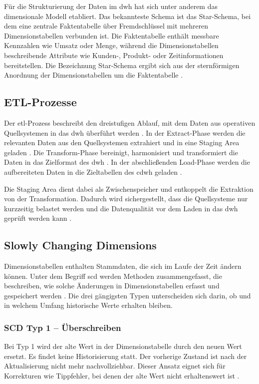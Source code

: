 \documentclass[a4paper,11pt]{article}
\begin{document}
Für die Strukturierung der Daten im \gls{dwh} hat sich unter anderem das dimensionale Modell etabliert. Das bekannteste 
Schema ist das Star-Schema, bei dem eine zentrale Faktentabelle über Fremdschlüssel mit mehreren Dimensionstabellen 
verbunden ist. Die Faktentabelle enthält messbare Kennzahlen wie Umsatz oder Menge, 
während die Dimensionstabellen beschreibende Attribute wie Kunden-, Produkt- oder Zeitinformationen bereitstellen. 
Die Bezeichnung Star-Schema ergibt sich aus der sternförmigen Anordnung der Dimensionstabellen um die Faktentabelle \parencite[S.~60--62]{baars2021bi}.

\subsection{ETL-Prozesse}
Der \gls{etl}-Prozess beschreibt den dreistufigen Ablauf, mit dem Daten aus operativen Quellsystemen in das \gls{dwh} überführt 
werden \parencite[S.~25]{baars2021bi}. In der Extract-Phase werden die relevanten Daten aus den Quellsystemen extrahiert 
und in eine Staging Area geladen \parencite[S.~27--28]{baars2021bi}. Die Transform-Phase bereinigt, harmonisiert und 
transformiert die Daten in das Zielformat des \gls{dwh} \parencite[S.~30--33]{baars2021bi}. In der abschließenden 
Load-Phase werden die aufbereiteten Daten in die Zieltabellen des \gls{cdwh} geladen \parencite[S.~36]{baars2021bi}.

Die Staging Area dient dabei als Zwischenspeicher und entkoppelt die Extraktion von der Transformation. Dadurch wird 
sichergestellt, dass die Quellsysteme nur kurzzeitig belastet werden und die Datenqualität vor dem Laden in das \gls{dwh} 
geprüft werden kann \parencite[S.~27--28]{baars2021bi}.

\subsection{Slowly Changing Dimensions}
Dimensionstabellen enthalten Stammdaten, die sich im Laufe der Zeit ändern können. Unter dem Begriff 
\gls{scd} werden Methoden zusammengefasst, die beschreiben, wie solche Änderungen in Dimensionstabellen 
erfasst und gespeichert werden \parencite[S.~181]{linstedt2015data}. Die drei gängigsten Typen unterscheiden sich darin, ob und in welchem 
Umfang historische Werte erhalten bleiben.

\subsubsection{SCD Typ 1 -- Überschreiben}
Bei Typ 1 wird der alte Wert in der Dimensionstabelle durch den neuen Wert ersetzt. Es findet keine 
Historisierung statt. Der vorherige Zustand ist nach der Aktualisierung nicht mehr nachvollziehbar. 
Dieser Ansatz eignet sich für Korrekturen wie Tippfehler, bei denen der alte Wert nicht erhaltenswert ist \parencite[S.~181]{linstedt2015data}.
\end{document}
